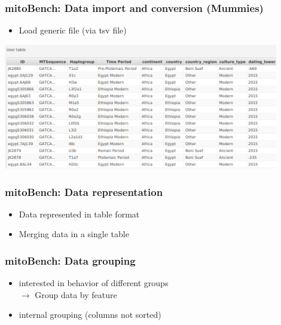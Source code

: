 \documentclass{beamer} %
\begin{document}
\begin{frame}
	\frametitle{mitoBench: Data import and conversion (Mummies)}
	\begin{itemize}
		\item Load generic file (via tsv file)
	\end{itemize}
	\begin{center}
		\includegraphics[width=0.9\textwidth]{imagesBench/load_generic.png}
	\end{center}
\end{frame}

\begin{frame}
	\frametitle{mitoBench: Data representation}
	\begin{itemize}
		\item Data represented in table format\pause
		\item Merging data in a single table
	\end{itemize}
\end{frame}

\begin{frame}
	\frametitle{mitoBench: Data grouping}
	\begin{itemize}
		\item interested in behavior of different groups\\
		 $\rightarrow$ Group data by feature\pause
		\item internal grouping (columns not sorted)
	\end{itemize}
\end{frame}
\end{document}
